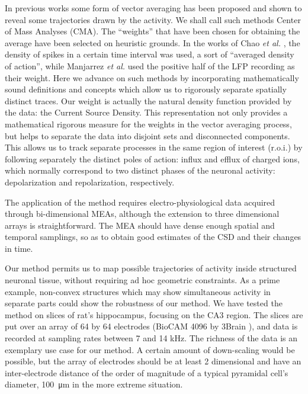 \documentclass[utf8]{frontiersSCNS}
\newcommand{\mum}[1]{\SI{#1}{\micro\metre}}
\begin{document}
In previous works some form of vector averaging has been proposed and shown to reveal some trajectories drawn by the activity. We shall call such methods Center of Mass Analyses (CMA).  The ``weights'' that have been chosen for obtaining the average have been selected on heuristic grounds. In the works of Chao \emph{et al.} \citep{Chao05, Chao07}, the density of spikes in a certain time interval was used, a sort of ``averaged density of action'', while Manjarrez \emph{et al.} \citep{Manjarrez07, Manjarrez09} used the positive half of the LFP recording as their weight. 
Here we advance on such methods by incorporating mathematically sound definitions and concepts which allow us to rigorously separate spatially distinct traces. Our weight is actually the natural density function provided by the data: the Current Source Density. This representation not only provides a mathematical rigorous  measure for the weights in the vector averaging process, but helps to separate the data into disjoint sets and disconnected components.
This allows us to track separate processes in the same region of interest
(r.o.i.) by following separately the distinct poles of action: influx and
efflux of charged ions, which normally correspond to two distinct phases of the
neuronal activity: depolarization and repolarization, respectively. 

The application of the method requires electro-physiological data acquired
through bi-dimensional MEAs, although the extension to three dimensional arrays
is straightforward.
The MEA should have dense enough spatial and temporal samplings,
so as to obtain good estimates of the CSD and their changes in time.

Our method permits us to map possible trajectories of activity inside structured neuronal tissue, without requiring ad hoc geometric constraints. As a prime example, non-convex structures which may show simultaneous activity in separate parts could show the robustness of our method. We have tested the method on slices of rat's hippocampus, focusing on the CA3 region. The slices are put over an array of 64 by 64 electrodes
(BioCAM 4096 by 3Brain \citep{BioCam}),
and data is recorded at sampling rates between 7 and 14 kHz. The richness of the
data is an exemplary use case for our method. A certain amount of down-scaling would be 
possible, but the array of electrodes should be at least 2 dimensional and
have an inter-electrode distance of the order of magnitude of a typical pyramidal cell's diameter, \mum{100} in the more extreme situation. 
\end{document}
